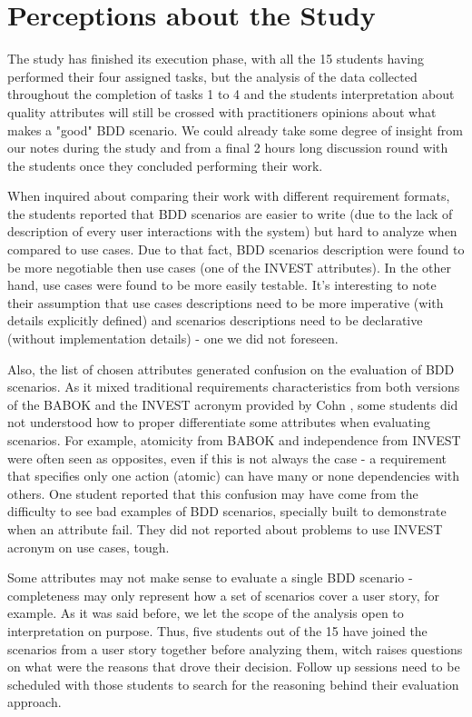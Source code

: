 \section{Perceptions about the Study}

The study has finished its execution phase, with all the 15 students having performed their four assigned tasks, but the analysis of the data collected throughout the completion of tasks 1 to 4 and the students interpretation about quality attributes will still be crossed with practitioners opinions about what makes a "good" BDD scenario. We could already take some degree of insight from our notes during the study and from a final 2 hours long discussion round with the students once they concluded performing their work.

When inquired about comparing their work with different requirement formats, the students reported that BDD scenarios are easier to write (due to the lack of description of every user interactions with the system) but hard to analyze when compared to use cases. Due to that fact, BDD scenarios description were found to be more negotiable then use cases (one of the INVEST attributes). In the other hand, use cases were found to be more easily testable. It's interesting to note their assumption that use cases descriptions need to be more imperative (with details explicitly defined) and scenarios descriptions need to be declarative (without implementation details) - one we did not foreseen.

Also, the list of chosen attributes generated confusion on the evaluation of BDD scenarios. As it mixed traditional requirements characteristics from both versions of the BABOK \cite{Babok_2009} \cite{Babok_2015} and the INVEST acronym provided by Cohn \cite{Cohn_2004}, some students did not understood how to proper differentiate some attributes when evaluating scenarios. For example, atomicity from BABOK \cite{Babok_2015} and independence from INVEST \cite{Cohn_2004} were often seen as opposites, even if this is not always the case - a requirement that specifies only one action (atomic) can have many or none dependencies with others. One student reported that this confusion may have come from the difficulty to see bad examples of BDD scenarios, specially built to demonstrate when an attribute fail. They did not reported about problems to use INVEST acronym on use cases, tough.

Some attributes may not make sense to evaluate a single BDD scenario - completeness may only represent how a set of scenarios cover a user story, for example. As it was said before, we let the scope of the analysis open to interpretation on purpose. Thus, five students out of the 15 have joined the scenarios from a user story together before analyzing them, witch raises questions on what were the reasons that drove their decision. Follow up sessions need to be scheduled with those students to search for the reasoning behind their evaluation approach. 


